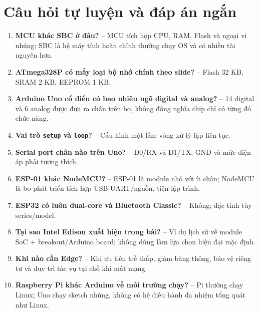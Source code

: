 \section{Câu hỏi tự luyện và đáp án ngắn}
\begin{enumerate}
\item \textbf{MCU khác SBC ở đâu?} -- MCU tích hợp CPU, RAM, Flash và ngoại vi nhúng; SBC là hệ máy tính hoàn chỉnh thường chạy OS và có nhiều tài nguyên hơn.
\item \textbf{ATmega328P có mấy loại bộ nhớ chính theo slide?} -- Flash 32 KB, SRAM 2 KB, EEPROM 1 KB.
\item \textbf{Arduino Uno cổ điển có bao nhiêu ngõ digital và analog?} -- 14 digital và 6 analog được đưa ra chân trên bo, không đồng nghĩa chip chỉ có từng đó chức năng.
\item \textbf{Vai trò \texttt{setup} và \texttt{loop}?} -- Cấu hình một lần; vòng xử lý lặp liên tục.
\item \textbf{Serial port chân nào trên Uno?} -- D0/RX và D1/TX; GND và mức điện áp phải tương thích.
\item \textbf{ESP-01 khác NodeMCU?} -- ESP-01 là module nhỏ với ít chân; NodeMCU là bo phát triển tích hợp USB-UART/nguồn, tiện lập trình.
\item \textbf{ESP32 có luôn dual-core và Bluetooth Classic?} -- Không; đặc tính tùy series/model.
\item \textbf{Tại sao Intel Edison xuất hiện trong bài?} -- Ví dụ lịch sử về module SoC + breakout/Arduino board; không dùng làm lựa chọn hiện đại mặc định.
\item \textbf{Khi nào cần Edge?} -- Khi ưu tiên trễ thấp, giảm băng thông, bảo vệ riêng tư và duy trì tác vụ tại chỗ khi mất mạng.
\item \textbf{Raspberry Pi khác Arduino về môi trường chạy?} -- Pi thường chạy Linux; Uno chạy sketch nhúng, không có hệ điều hành đa nhiệm tổng quát như Linux.
\end{enumerate}


